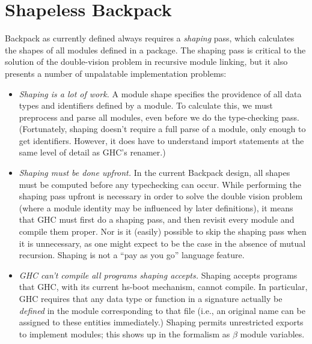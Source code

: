 \documentclass{article}
\begin{document}
\section{Shapeless Backpack}\label{sec:simplifying-backpack}

Backpack as currently defined always requires a \emph{shaping} pass,
which calculates the shapes of all modules defined in a package.
The shaping pass is critical to the solution of the double-vision problem
in recursive module linking, but it also presents a number of unpalatable
implementation problems:

\begin{itemize}

    \item \emph{Shaping is a lot of work.} A module shape specifies the
        providence of all data types and identifiers defined by a
        module. To calculate this, we must preprocess and parse all
        modules, even before we do the type-checking pass.  (Fortunately,
        shaping doesn't require a full parse of a module, only enough
        to get identifiers.  However, it does have to understand import
        statements at the same level of detail as GHC's renamer.)

    \item \emph{Shaping must be done upfront.} In the current Backpack
        design, all shapes must be computed before any typechecking can
        occur.  While performing the shaping pass upfront is necessary
        in order to solve the double vision problem (where a module
        identity may be influenced by later definitions), it means
        that GHC must first do a shaping pass, and then revisit every module and
        compile them proper.  Nor is it (easily) possible to skip the
        shaping pass when it is unnecessary, as one might expect to be
        the case in the absence of mutual recursion.  Shaping is not
        a ``pay as you go'' language feature.

    \item \emph{GHC can't compile all programs shaping accepts.}  Shaping
        accepts programs that GHC, with its current hs-boot mechanism, cannot
        compile.  In particular, GHC requires that any data type or function
        in a signature actually be \emph{defined} in the module corresponding
        to that file (i.e., an original name can be assigned to these entities
        immediately.)  Shaping permits unrestricted exports to implement
        modules; this shows up in the formalism as $\beta$ module variables.


\end{itemize}
\end{document}
